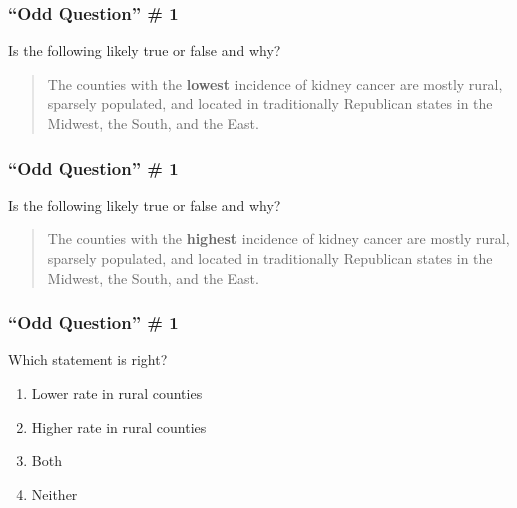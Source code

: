 \documentclass{beamer}
\begin{document}
\begin{singlespace}
\begin{frame}
\frametitle{``Odd Question'' \# 1}
	Is the following likely true or false and why? 
	\begin{quote}
	    The counties with the \textbf{lowest} incidence of kidney cancer are mostly rural, sparsely 
	    populated, and located in traditionally Republican states in the Midwest, the South, and the 
	    East. 
	\end{quote}
\end{frame}

\begin{frame}
\frametitle{``Odd Question'' \# 1}
	Is the following likely true or false and why? 
	\begin{quote}
	    The counties with the \textbf{highest} incidence of kidney cancer are mostly rural, sparsely 
	    populated, and located in traditionally Republican states in the Midwest, the South, and the 
	    East. 
	\end{quote}
\end{frame}

\begin{frame}
\frametitle{``Odd Question'' \# 1}
    Which statement is right?    
    \begin{enumerate}
        \item Lower rate in rural counties
        \item Higher rate in rural counties
        \item \alert<2->{Both}
        \item Neither
    \end{enumerate}
\end{frame}


\end{singlespace}
\end{document}
